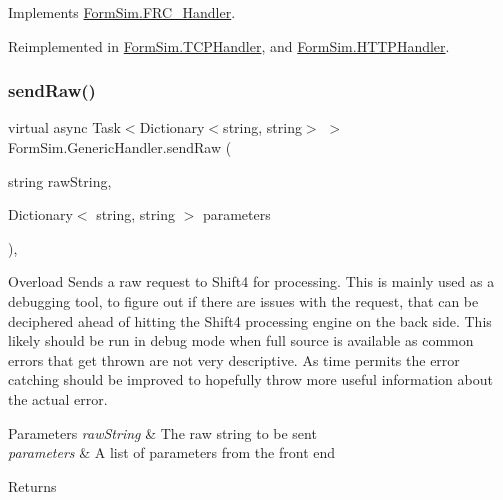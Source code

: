 Implements \mbox{\hyperlink{interface_form_sim_1_1_f_r_c___handler_a1f855ed4026632d00ac5fc6784c3bf0f}{Form\+Sim.\+F\+R\+C\+\_\+\+Handler}}.



Reimplemented in \mbox{\hyperlink{class_form_sim_1_1_t_c_p_handler_a810309bc6e943b6ff12ebed8401613f0}{Form\+Sim.\+T\+C\+P\+Handler}}, and \mbox{\hyperlink{class_form_sim_1_1_h_t_t_p_handler_a31006e646afd7cb331784dce27760d5b}{Form\+Sim.\+H\+T\+T\+P\+Handler}}.

\mbox{\label{class_form_sim_1_1_generic_handler_a9e6731b583644ba3bd5bde94ef86c678}} 
\subsubsection{\texorpdfstring{send\+Raw()}{sendRaw()}\hspace{0.1cm}{\footnotesize\ttfamily [2/2]}}
{\footnotesize\ttfamily virtual async Task$<$Dictionary$<$string, string$>$ $>$ Form\+Sim.\+Generic\+Handler.\+send\+Raw (\begin{DoxyParamCaption}\item[{string}]{raw\+String,  }\item[{Dictionary$<$ string, string $>$}]{parameters }\end{DoxyParamCaption})\hspace{0.3cm}{\ttfamily [inline]}, {\ttfamily [virtual]}}



Overload Sends a raw request to Shift4 for processing. This is mainly used as a debugging tool, to figure out if there are issues with the request, that can be deciphered ahead of hitting the Shift4 processing engine on the back side. This likely should be run in debug mode when full source is available as common errors that get thrown are not very descriptive. As time permits the error catching should be improved to hopefully throw more useful information about the actual error. 


\begin{DoxyParams}{Parameters}
{\em raw\+String} & The raw string to be sent\\
\hline
{\em parameters} & A list of parameters from the front end\\
\hline
\end{DoxyParams}
\begin{DoxyReturn}{Returns}

\end{DoxyReturn}


